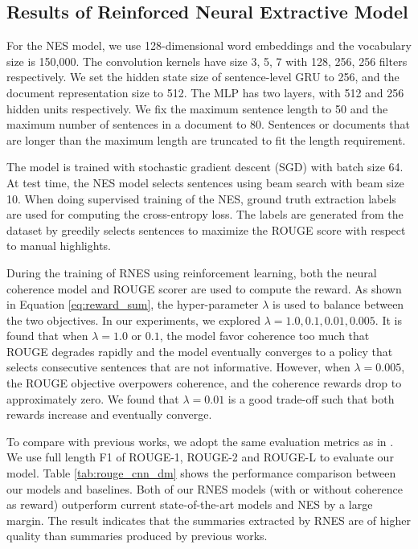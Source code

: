 \documentclass[letterpaper]{article} %
\begin{document}
	\subsection{Results of Reinforced Neural Extractive Model}
	For the NES model, we use 128-dimensional word embeddings and the vocabulary size is 150,000. The convolution kernels have size 3, 5, 7 with 128, 256, 256 filters respectively. We set the hidden state size of sentence-level GRU to 256, and the document representation size to 512. The MLP has two layers, with 512 and 256 hidden units respectively. We fix the maximum sentence length to 50 and the maximum number of sentences in a document to 80. Sentences or documents that are longer than the maximum length are truncated to fit the length requirement.
	
	The model is trained with stochastic gradient descent (SGD) with batch size 64. At test time, the NES model selects sentences using beam search with beam size 10. When doing supervised training of the NES, ground truth extraction labels are used for computing the cross-entropy loss. The labels are generated from the dataset by greedily selects sentences to maximize the ROUGE score with respect to manual highlights.
	
	During the training of RNES using reinforcement learning, both the neural coherence model and ROUGE scorer are used to compute the reward. As shown in Equation \ref{eq:reward_sum}, the hyper-parameter $\lambda$ is used to balance between the two objectives. In our experiments, we explored $\lambda=1.0, 0.1, 0.01, 0.005$. It is found that when $\lambda=1.0$ or $0.1$, the model favor coherence too much that ROUGE degrades rapidly and the model eventually converges to a policy that selects consecutive sentences that are not informative. However, when $\lambda = 0.005$, the ROUGE objective overpowers coherence, and the coherence rewards drop to approximately zero. We found that $\lambda=0.01$ is a good trade-off such that both rewards increase and eventually converge.
	
	To compare with previous works, we adopt the same evaluation metrics as in \cite{SummaRuNNer}. We use full length F1 of ROUGE-1, ROUGE-2 and ROUGE-L to evaluate our model. Table \ref{tab:rouge_cnn_dm} shows the performance comparison between our models and baselines. Both of our RNES models (with or without coherence as reward) outperform current state-of-the-art models and NES by a large margin. The result indicates that the summaries extracted by RNES are of higher quality than summaries produced by previous works. 
	
\end{document}
